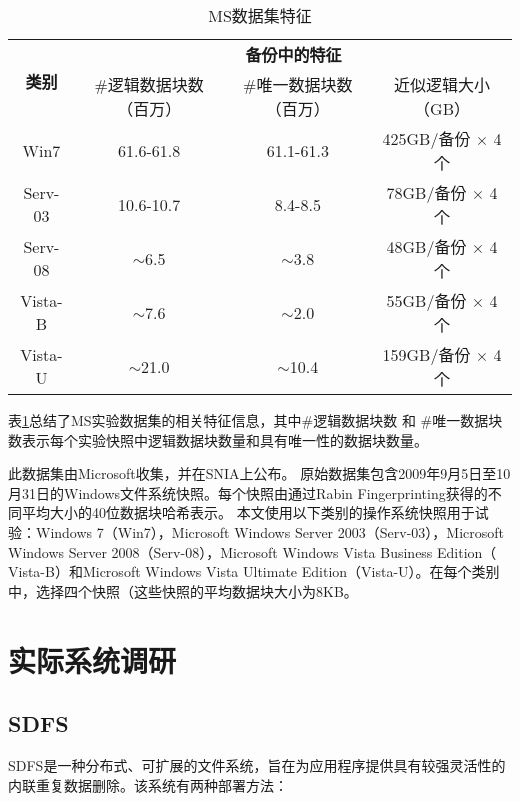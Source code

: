 \begin{table}[!hbt]
    \caption{MS数据集特征}
\small
\label{tab:MS-dataset}
\renewcommand{\arraystretch}{1.2}
\vspace{-3pt}
\centering
\begin{tabular}{|c|c|c|c|}
\hline
\multirow{2}{*}{\bf 类别} & \multicolumn{3}{c|}{\bf 备份中的特征} \\
\cline{2-4}
    & \#逻辑数据块数（百万） & \#唯一数据块数（百万） & 近似逻辑大小（GB）\\

\hline
Win7  & 61.6-61.8 & 61.1-61.3 & 425GB/备份 $\times$ 4 个\\
\cline{1-4}
Serv-03 & 10.6-10.7 & 8.4-8.5 & 78GB/备份 $\times$ 4 个\\
\cline{1-4}
Serv-08 & $\sim$6.5 & $\sim$3.8 & 48GB/备份 $\times$ 4 个\\
\cline{1-4}
Vista-B &  $\sim$7.6 & $\sim$2.0 & 55GB/备份 $\times$ 4 个\\
\cline{1-4}
Vista-U &  $\sim$21.0 & $\sim$10.4 & 159GB/备份 $\times$ 4 个\\
\hline
\end{tabular}
\end{table}

表\ref{tab:MS-dataset}总结了MS实验数据集的相关特征信息，其中\#逻辑数据块数 和 \#唯一数据块数表示每个实验快照中逻辑数据块数量和具有唯一性的数据块数量。

此数据集由Microsoft\cite{meyer2012study}收集，并在SNIA\cite{ms}上公布。 原始数据集包含2009年9月5日至10月31日的Windows文件系统快照。每个快照由通过Rabin Fingerprinting\cite{rabin1981fingerprinting}获得的不同平均大小的40位数据块哈希表示。 本文使用以下类别的操作系统快照用于试验：Windows 7（Win7），Microsoft Windows Server 2003（Serv-03），Microsoft Windows Server 2008（Serv-08），Microsoft Windows Vista Business Edition（ Vista-B）和Microsoft Windows Vista Ultimate Edition（Vista-U）。在每个类别中，选择四个快照（这些快照的平均数据块大小为8KB。 


\section{实际系统调研}
\subsection{SDFS}

SDFS\cite{SDFS}是一种分布式、可扩展的文件系统，旨在为应用程序提供具有较强灵活性的内联重复数据删除。该系统有两种部署方法：

